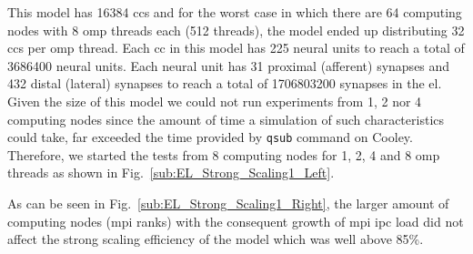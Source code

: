 \documentclass[10pt,journal,compsoc]{IEEEtran}
\begin{document}
This model has 16384 \glspl{cc} and for the worst case in which there are 64 computing nodes with 8 \gls{omp} threads each (512 threads), the model ended up distributing 32 \glspl{cc} per \gls{omp} thread. Each \gls{cc} in this model has 225 neural units to reach a total of 3686400 neural units. Each neural unit has 31 proximal (afferent) synapses and 432 distal (lateral) synapses to reach a total of 1706803200 synapses in the \gls{el}. Given the size of this model we could not run experiments from 1, 2 nor 4 computing nodes since the amount of time a simulation of such characteristics could take, far exceeded the time provided by \texttt{qsub} command on Cooley. Therefore, we started the tests from 8 computing nodes for 1, 2, 4 and 8 \gls{omp} threads as shown in Fig.~\ref{sub:EL_Strong_Scaling1_Left}.





As can be seen in Fig.~\ref{sub:EL_Strong_Scaling1_Right}, the larger amount of computing nodes (\gls{mpi} ranks) with the consequent growth of \gls{mpi} \gls{ipc} load did not affect the strong scaling efficiency of the model which was well above 85\%.
\end{document}
